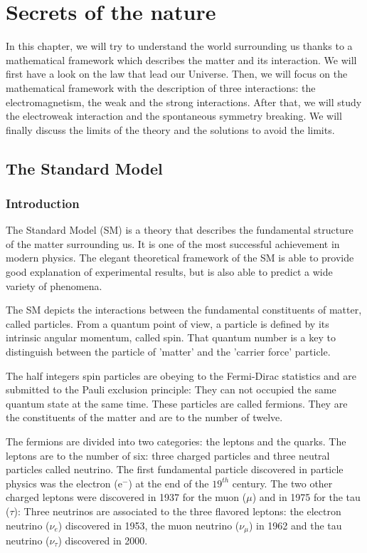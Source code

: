 \chapter{Secrets of the nature}

    In this chapter, we will try to understand the world surrounding us thanks to a mathematical framework which describes the matter and its interaction.
    We will first have a look on the law that lead our Universe. Then, we will focus on the mathematical framework with the description of three interactions: the electromagnetism, the weak and the strong interactions.
    After that, we will study the electroweak interaction and the spontaneous symmetry breaking. We will finally discuss the limits of the theory and the solutions to avoid the limits. 
 \minitoc
  \section{The Standard Model}

    \subsection{Introduction}
    
    The Standard Model (SM) is a theory that describes the fundamental structure of the matter surrounding us. 
    It is one of the most successful achievement in modern physics.
    The elegant theoretical framework of the SM is able to provide good explanation of experimental results, but is also able to predict a wide variety of phenomena.

    The SM depicts the interactions between the fundamental constituents of matter, called particles.
    From a quantum point of view, a particle is defined by its intrinsic angular momentum, called spin. 
    That quantum number is a key to distinguish between the particle of 'matter' and the 'carrier force' particle.
    
    The half integers spin particles are obeying to the Fermi-Dirac statistics and are submitted to the Pauli exclusion principle:
    They can not occupied the same quantum state at the same time.
    These particles are called fermions.
    They are the constituents of the matter and are to the number of twelve.

    The fermions are divided into two categories: the leptons and the quarks. 
    The leptons are to the number of six: three charged particles and three neutral particles called neutrino.
    The first fundamental particle discovered in particle physics was the electron (e$^-$) at the end of the $19^{th}$ century.
    The two other charged leptons were discovered in 1937 for the muon ($\mu$) and in 1975 for the tau ($\tau$):
    Three neutrinos are associated to the three flavored leptons: the electron neutrino ($\nu_e$) discovered in 1953, the muon neutrino ($\nu_{\mu}$) in 1962 and the tau neutrino ($\nu_{\tau}$) discovered in 2000.

